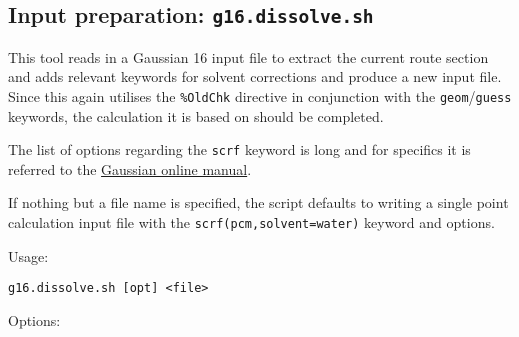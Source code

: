 \documentclass[   %
  final,          %
  a4paper         %
]{article}
\begin{document}
\subsection{Input preparation: \texorpdfstring{{\lstinline`g16.dissolve.sh`}}{g16.dissolve.sh}}
\label{sec:g16.dissolve}

This tool reads in a Gaussian 16 input file to extract the current route section
and adds relevant keywords for solvent corrections and produce a new input file.
Since this again utilises the \texttt{\%OldChk} directive in conjunction with 
the \texttt{geom}/\texttt{guess} keywords, the calculation it is based on should be completed.

The list of options regarding the \texttt{scrf} keyword is long and for specifics
it is referred to the \href{http://gaussian.com/scrf/}{Gaussian online manual}.

If nothing but a file name is specified, the script defaults to writing
a single point calculation input file with the \texttt{scrf(pcm,solvent=water)} keyword and options.

Usage: 

\lstinline`g16.dissolve.sh [opt] <file>`

Options:
\end{document}
